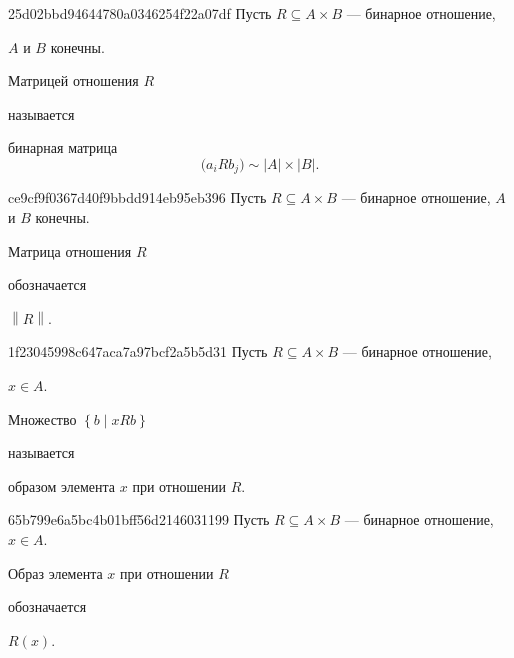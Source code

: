\begin{note}{25d02bbd94644780a0346254f22a07df}
    Пусть \({ R \subseteq A \times B }\) --- бинарное отношение, \begin{icloze}{3}\({ A }\) и \({ B }\) конечны.\end{icloze}
    \begin{icloze}{2}Матрицей отношения \({ R }\)\end{icloze} называется
    \begin{icloze}{1}
        бинарная матрица
        \[
            \Big( a_i R b_j \Big) \sim \left\lvert A \right\rvert \times \left\lvert B \right\rvert.
        \]
    \end{icloze}
\end{note}

\begin{note}{ce9cf9f0367d40f9bbdd914eb95eb396}
    Пусть \({ R \subseteq A \times B }\) --- бинарное отношение, \({ A }\) и \({ B }\) конечны.
    \begin{icloze}{2}Матрица отношения \({ R }\)\end{icloze} обозначается \begin{icloze}{1}\({ \left\lVert R \right\rVert }\).\end{icloze}
\end{note}

\begin{note}{1f23045998c647aca7a97bcf2a5b5d31}
    Пусть \({ R \subseteq A \times B }\) --- бинарное отношение, \begin{icloze}{3}\({ x \in A }\).\end{icloze}
    \begin{icloze}{1}Множество \({ \left\{ b \mid xRb \right\} }\)\end{icloze} называется \begin{icloze}{2}образом элемента \({ x }\) при отношении \({ R }\).\end{icloze}
\end{note}

\begin{note}{65b799e6a5bc4b01bff56d2146031199}
    Пусть \({ R \subseteq A \times B }\) --- бинарное отношение, \({ x \in A }\).
    \begin{icloze}{2}Образ элемента \({ x }\) при отношении \({ R }\)\end{icloze} обозначается \begin{icloze}{1}\({ R(x) }\).\end{icloze}
\end{note}

